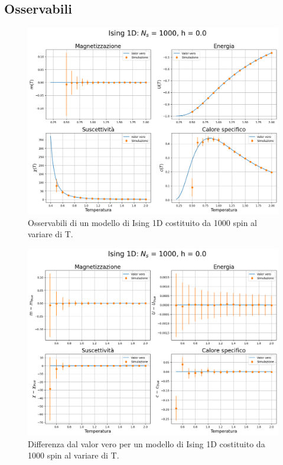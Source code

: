 \vspace*{\fill}

\newpage



\subsection{Osservabili}

\vspace*{\fill}

\begin{figure}[htbp]
    \centering
    \includegraphics[page=1, width=\textwidth]{Immagini/simIsing1D/obs/obs_1000_0.0.png}
    \caption{Osservabili di un modello di Ising 1D costituito da 1000 spin al variare di T.}
\end{figure}

\vspace*{\fill}

\newpage

\vspace*{\fill}

\begin{figure}[htbp]
    \centering
    \includegraphics[page=1, width=\textwidth]{Immagini/simIsing1D/obs/obs_1000_0.0_diff.png}
    \caption{Differenza dal valor vero per un modello di Ising 1D costituito da 1000 spin al variare di T.}
\end{figure}

